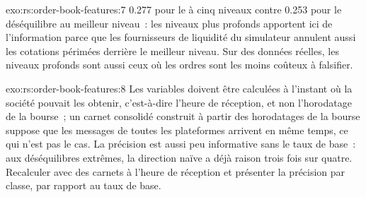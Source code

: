 \begin{solution}{exo:rs:order-book-features:7}
0.277 pour le  à cinq niveaux contre 0.253 pour le déséquilibre au meilleur niveau~: les niveaux plus profonds apportent ici de l'information parce que
les fournisseurs de liquidité du simulateur annulent aussi les cotations périmées derrière le meilleur niveau. Sur des données réelles, les niveaux profonds sont aussi ceux où les ordres sont
les moins coûteux à falsifier.
\end{solution}

\begin{solution}{exo:rs:order-book-features:8}
Les variables doivent être calculées à l'instant où la société pouvait les obtenir, c'est-à-dire l'heure de réception, et non l'horodatage de la bourse~; un carnet consolidé construit
à partir des horodatages de la bourse suppose que les messages de toutes les plateformes arrivent en même temps, ce qui n'est pas le cas. La précision est aussi peu informative sans le
taux de base~: aux déséquilibres extrêmes, la direction naïve a déjà raison trois fois sur quatre. Recalculer avec des carnets à l'heure de réception et présenter la
précision par classe, par rapport au taux de base.
\end{solution}

